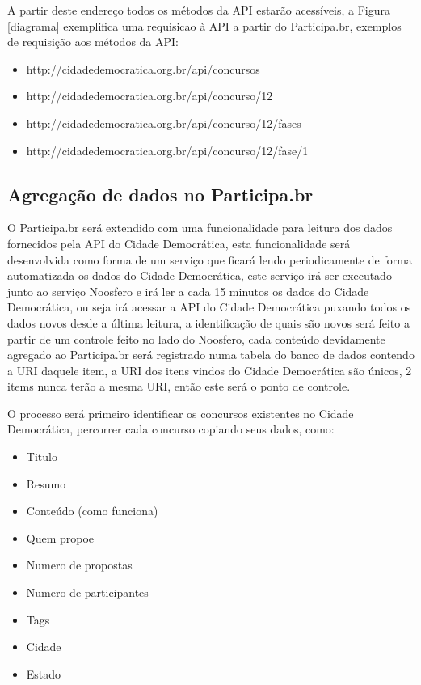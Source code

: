\documentclass[12pt]{article}
\begin{document}
A partir deste endereço todos os métodos da API estarão acessíveis, a Figura
\ref{diagrama} exemplifica uma requisicao à API a partir do Participa.br,
exemplos de requisição aos métodos da API:

\begin{itemize}
  \item http://cidadedemocratica.org.br/api/concursos
  \item http://cidadedemocratica.org.br/api/concurso/12
  \item http://cidadedemocratica.org.br/api/concurso/12/fases
  \item http://cidadedemocratica.org.br/api/concurso/12/fase/1
\end{itemize}

\subsection{Agregação de dados no Participa.br}

O Participa.br será extendido com uma funcionalidade para leitura dos dados
fornecidos pela API do Cidade Democrática, esta funcionalidade será
desenvolvida como forma de um serviço que ficará lendo periodicamente de forma
automatizada os dados do Cidade Democrática, este serviço irá ser executado
junto ao serviço Noosfero e irá ler a cada 15 minutos os dados do Cidade
Democrática, ou seja irá acessar a API do Cidade Democrática puxando todos os
dados novos desde a última leitura, a identificação de quais são novos será
feito a partir de um controle feito no lado do Noosfero, cada conteúdo
devidamente agregado ao Participa.br será registrado numa tabela do banco de
dados contendo a URI daquele item, a URI dos itens vindos do Cidade
Democrática são únicos, 2 items nunca terão a mesma URI, então este será o
ponto de controle.

O processo será primeiro identificar os concursos existentes no Cidade
Democrática, percorrer cada concurso copiando seus dados, como:

\begin{itemize}
  \item Titulo
  \item Resumo
  \item Conteúdo (como funciona)
  \item Quem propoe
  \item Numero de propostas
  \item Numero de participantes
  \item Tags
  \item Cidade
  \item Estado
\end{itemize}
\end{document}
